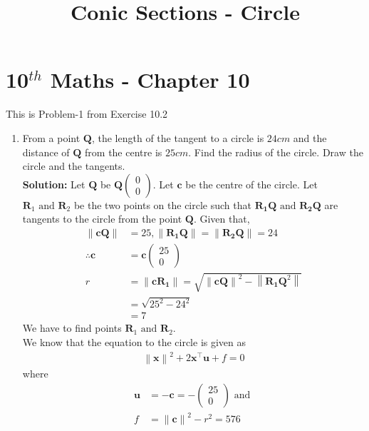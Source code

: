 \documentclass[12pt]{article}
\providecommand{\norm}[1]{\left\lVert#1\right\rVert}
\newcommand{\solution}{\noindent \textbf{Solution: }}
\newcommand{\myvec}[1]{\ensuremath{\begin{pmatrix}#1\end{pmatrix}}}
\let\vec\mathbf
\begin{document}
\begin{center}
\title{\textbf{Conic Sections - Circle}}
\date{\vspace{-5ex}} %
\maketitle
\end{center}
\setcounter{page}{1}

\section{10$^{th}$ Maths - Chapter 10}
This is Problem-1 from Exercise 10.2
\begin{enumerate}
\item From a point $\vec{Q}$, the length of the tangent to a circle is $24 cm$ and the distance of $\vec{Q}$ from the centre is $25 cm$. Find the radius of the circle. Draw the circle and the tangents. \\ 
\solution 
Let $\vec{Q}$ be $\vec{Q}\myvec{0 \\ 0}$. Let $\vec{c}$ be the centre of the circle. Let $\vec{R}_1 \text{ and } \vec{R}_2$ be the two points on the circle such that $\vec{R_1Q} \text{ and } \vec{R_2Q}$ are tangents to the circle from the point $\vec{Q}$. Given that,  
\begin{align}
	\norm{\vec{cQ}} &= 25, \norm{\vec{R_1Q}} = \norm{\vec{R_2Q}} = 24 \\ 
	\therefore \vec{c} &= \vec{c}\myvec{25 \\ 0} \\
	r &= \norm{\vec{cR_1}} = \sqrt{\norm{\vec{cQ}}^2 - \norm{\vec{R_1Q}^2}}  \\
	&= \sqrt{25^2 - 24^2} \\
	&= 7
\end{align}
We have to find points $\vec{R}_1 \text{ and } \vec{R}_2$. \\
We know that the equation to the circle is given as
\begin{align}
	\label{eq:circEq1}
	\norm{\vec{x}}^2+2\vec{x}^\top\vec{u}+f = 0 
\end{align}
where
\begin{align}
	\vec{u} &= -\vec{c}  = -\myvec{25 \\ 0}\text{ and } \\
        \label{eq:fRelation}
	f &= \norm{\vec{c}}^2 - r^2 = 576
\end{align}
\begin{align}

\end{align}
\end{enumerate}
\end{document}
